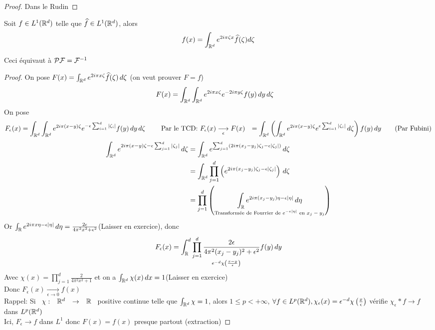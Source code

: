 \documentclass[]{report}
\begin{document}
    \begin{proof}
        Dans le Rudin
    \end{proof}

    \begin{prop}{}{}
        Soit $f\in L^1(\mathbb{R}^d)$ telle que $\widehat{f}\in L^1(\mathbb{R}^d)$, alors
        \[f(x)=\int_{\mathbb{R}^d}e^{2i\pi\zeta x}\widehat{f}(\zeta)d\zeta\]
    \end{prop}

    \begin{re}{}{}
        Ceci équivaut à $\mathcal{P} \mathcal{F}=\mathcal{F}^{-1}$
    \end{re}

    \begin{proof}
        On pose $F(x)=\int_{\mathbb{R}^d}e^{2i\pi x\zeta}\widehat{f}(\zeta)\, d\zeta$ (on veut prouver $F=f$)\\
        \begin{align*}
            F(x)&=\int_{\mathbb{R}^d}\int_{\mathbb{R}^d} e^{2i\pi x\zeta} e^{-2i\pi y\zeta}f(y)\, dy\, d\zeta
        \end{align*}
        On pose
        \begin{align*}
            F_\epsilon(x)&=\int_{\mathbb{R}^d}\int_{\mathbb{R}^d}e^{2i\pi(x-y)\zeta}e^{-\epsilon \sum_{i=1}^{d}|\zeta_i|}f(y)\, dy\, d\zeta\qquad \text{ Par le TCD: $F_\epsilon(x)\underset{\epsilon}{\longrightarrow}F(x)$}
            &=\int_{\mathbb{R}^d}\left(\int_{\mathbb{R}^d}e^{2i\pi(x-y)\zeta}e^{\epsilon\sum_{i=1}^{d}|\zeta_i|}\, d\zeta\right)f(y)\, dy \qquad\text{(Par Fubini)}
        \end{align*}
        \begin{align*}
            \int_{\mathbb{R}^d}e^{2i\pi(x-y)\zeta-\epsilon\sum_{j=1}^{d}|\zeta_j|}\, d\zeta&= \int_{\mathbb{R}^d}e^{\sum_{j=1}^{d}(2i\pi(x_j-y_j)\zeta_j-\epsilon |\zeta_j|)}\, d\zeta\\
            &=\int_{\mathbb{R}^d}\prod_{j=1}^{d}\left(e^{2i\pi(x_j-y_j)\zeta_j-\epsilon |\zeta_j|}\right)\, d\zeta\\
            &=\prod_{j=1}^{d}\left(\underset{\text{Transformée de Fourrier de $e^{-\epsilon|\eta|}$ en $x_j-y_j$}}{\int_{\mathbb{R}} e^{2i\pi(x_j-y_j)\eta-\epsilon|\eta|}\, d\eta}\right)
        \end{align*}
        Or $\int_{\mathbb{R}} e^{2i\pi x\eta-\epsilon|\eta|}\, d\eta=\frac{2\epsilon}{4\pi^2x^2+\epsilon^2}$(Laisser en exercice), donc
        \[F_\epsilon(x)=\int_{\mathbb{R}}^d \underset{e^{-d}\chi\left(\frac{x-y}{\epsilon}\right)}{\prod_{j=1}^{d}\frac{2\epsilon}{4\pi^2(x_j-y_j)^2+\epsilon^2}}f(y)\,dy\]
        Avec $\chi(x)=\prod_{j=1}^{d}\frac{2}{4\pi^2 x^2+1}$ et on a $\int_{\mathbb{R}^d}\chi(x)\, dx=1$(Laisser en exercice)\\
        Donc $F_\epsilon(x)\underset{\epsilon\to 0}{\longrightarrow}f(x)$\\
        Rappel: Si $\begin{array}{ccccc} \chi : & \mathbb{R}^d & \to & \mathbb{R} \end{array}$ positive continue telle que $\int_{\mathbb{R}^d}\chi=1$, alors $1\le p<+\infty$, $\forall f\in L^p(\mathbb{R}^d), \chi_\epsilon (x)=\epsilon^{-d}\chi\left(\frac{x}{\epsilon}\right)$ vérifie $\chi_\epsilon * f\to f$ dans $L^p(\mathbb{R}^d)$\\
        Ici, $F_\epsilon \to f$ dans $L^1$ donc $F(x)=f(x)$ presque partout (extraction)
    \end{proof}
\end{document}
